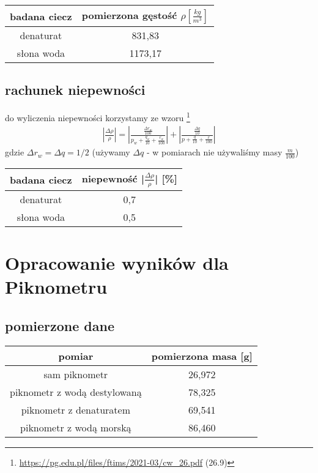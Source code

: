 \documentclass{article}
\begin{document}
\begin{center}
\begin{tabular}{ c | c }
badana ciecz & pomierzona gęstość $\rho [\frac{kg}{m^3}]$\\
\hline
 denaturat  & 831,83\\  
 słona woda & 1173,17
\end{tabular}
\end{center}

\subsection{rachunek niepewności}
do wyliczenia niepewności korzystamy ze wzoru \footnote{\url{https://pg.edu.pl/files/ftims/2021-03/cw_26.pdf} (26.9)}
\begin{gather*}
	|\frac{\Delta \rho}{\rho}| = |\frac{\frac{\Delta r_w}{100}}{p_w+\frac{q_w}{10} + \frac{r_w}{100}}| + |\frac{\frac{\Delta q}{10}}{p+\frac{q}{10} + \frac{r}{100}}|
\end{gather*}
gdzie $\Delta r_w = \Delta q = 1/2$ (używamy $\Delta q$ - w pomiarach nie używaliśmy masy $\frac{m}{100}$)

\begin{center}
\begin{tabular}{ c | c }
badana ciecz & niepewność |$\frac{\Delta \rho}{\rho}$| [\%] \\
\hline
denaturat  & 0,7\\  
słona woda & 0,5
\end{tabular}
\end{center}

\section{Opracowanie wyników dla Piknometru}

\subsection{pomierzone dane}
\begin{center}
\begin{tabular}{ c | c }
pomiar & pomierzona masa [g]  \\
\hline
sam piknometr &  26,972  \\ 
piknometr z wodą destylowaną& 78,325  \\  
piknometr z denaturatem & 69,541 \\
piknometr z wodą morską & 86,460    
\end{tabular}
\end{center}
\end{document}
